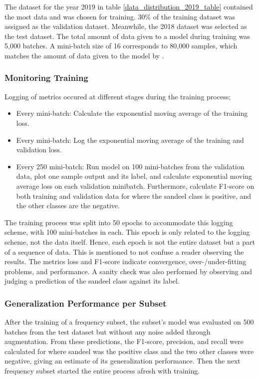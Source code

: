         
        
        The dataset for the year 2019 in table \ref{data_distribution_2019_table} contained the most data and was chosen for training. 30\% of the training dataset was assigned as the validation dataset. Meanwhile, the 2018 dataset was selected as the test dataset. The total amount of data given to a model during training was 5,000 batches. A mini-batch size of 16 corresponds to 80,000 samples, which matches the amount of data given to the model by  \citeauthor{brautaset2020acoustic} \cite{brautaset2020acoustic}.
        
        \subsubsection{Monitoring Training}
        Logging of metrics occured at different stages during the training process;
            \begin{itemize}
                \item Every mini-batch: Calculate the exponential moving average of the training loss.
                \item Every mini-batch: Log the exponential moving average of the training and validation loss.
                \item Every 250 mini-batch: Run model on 100 mini-batches from the validation data, plot one sample output and its label, and calculate  exponential moving average loss on each validation minibatch. Furthermore, calculate F1-score on both training and validation data for where the sandeel class is positive, and the other classes are the negative.
            \end{itemize}
            
        The training process was split into 50 epochs to accommodate this logging scheme, with 100 mini-batches in each. This epoch is only related to the logging scheme, not the data itself. Hence, each epoch is not the entire dataset but a part of a sequence of data. This is mentioned to not confuse a reader observing the results. The metrics loss and F1-score indicate convergence, over-/under-fitting problems, and performance. A sanity check was also performed by observing and judging a prediction of the sandeel class against its label.
        
        \subsubsection{Generalization Performance per Subset}
        After the training of a frequency subset, the subset’s model was evaluated on 500 batches from the test dataset but without any noise added through augmentation. From these predictions, the F1-score, precision, and recall were calculated for where sandeel was the positive class and the two other classes were negative, giving an estimate of its generalization performance. Then the next frequency subset started the entire process afresh with training.
        
